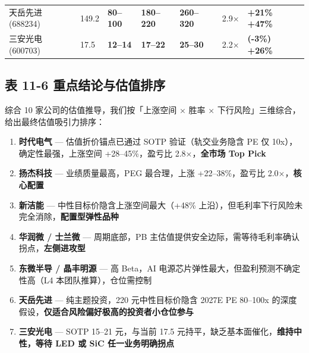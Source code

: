 \begin{exhibitbox}
\begin{tabularx}{\textwidth}{X C{1.4cm} C{1.55cm} C{1.6cm} C{1.6cm} C{1.25cm} C{1.6cm}}
\midrule
{}
\centering 天岳先进 \newline \scriptsize(688234) & ~149.2 & \textbf{80–100} & \textbf{180–220} & \textbf{260–320} & ~2.9× & \textbf{+21\% ~ +47\%} \\
\centering 三安光电 \newline \scriptsize(600703) & ~17.5 & \textbf{12–14} & \textbf{17–22} & \textbf{25–30} & ~2.2× & \textbf{(-3\%) ~ +26\%} \\
\bottomrule
\end{tabularx}
\vspace{0.2cm}
\end{exhibitbox}

\subsection{表 11-6 重点结论与估值排序}

综合 10 家公司的估值推导，我们按「上涨空间 × 胜率 × 下行风险」三维综合，给出最终估值吸引力排序：

\begin{enumerate}[leftmargin=2em]
\item \textbf{时代电气} — 估值折价锚点已通过 SOTP 验证（轨交业务隐含 PE 仅 10x），确定性最强，上涨空间 +28–45\%，盈亏比 2.8×，\textbf{全市场 Top Pick}
\item \textbf{扬杰科技} — 业绩质量最高，PEG 最合理，上涨 +22–38\%，盈亏比 2.0×，\textbf{核心配置}
\item \textbf{新洁能} — 中性目标价隐含上涨空间最大（+48\% 上沿），但毛利率下行风险未完全消除，\textbf{配置型弹性品种}
\item \textbf{华润微 / 士兰微} — 周期底部，PB 主估值提供安全边际，需等待毛利率确认拐点，\textbf{左侧进攻型}
\item \textbf{东微半导 / 晶丰明源} — 高 Beta，AI 电源芯片弹性最大，但盈利预测不确定性高（L4 本团队推算），仓位需控制
\item \textbf{天岳先进} — 纯主题投资，220 元中性目标价隐含 2027E PE 80–100x 的深度假设，\textbf{仅适合风险偏好极高的投资者小仓位参与}
\item \textbf{三安光电} — SOTP 15–21 元，与当前 17.5 元持平，缺乏基本面催化，\textbf{维持中性，等待 LED 或 SiC 任一业务明确拐点}
\end{enumerate}

